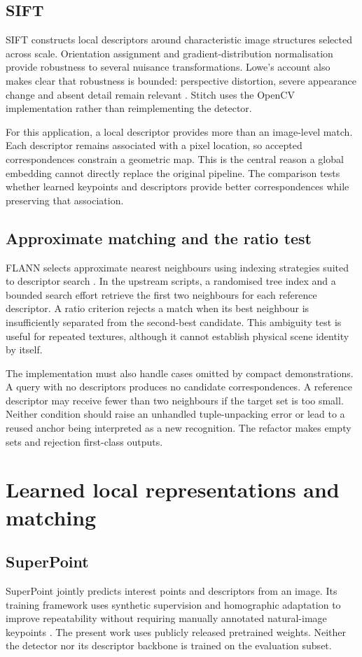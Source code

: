 \subsection{SIFT}
SIFT constructs local descriptors around characteristic image structures selected across scale. Orientation assignment and gradient-distribution normalisation provide robustness to several nuisance transformations. Lowe's account also makes clear that robustness is bounded: perspective distortion, severe appearance change and absent detail remain relevant \citep{lowe2004}. Stitch uses the OpenCV implementation rather than reimplementing the detector.

For this application, a local descriptor provides more than an image-level match. Each descriptor remains associated with a pixel location, so accepted correspondences constrain a geometric map. This is the central reason a global embedding cannot directly replace the original pipeline. The comparison tests whether learned keypoints and descriptors provide better correspondences while preserving that association.

\subsection{Approximate matching and the ratio test}
FLANN selects approximate nearest neighbours using indexing strategies suited to descriptor search \citep{muja2009}. In the upstream scripts, a randomised tree index and a bounded search effort retrieve the first two neighbours for each reference descriptor. A ratio criterion rejects a match when its best neighbour is insufficiently separated from the second-best candidate. This ambiguity test is useful for repeated textures, although it cannot establish physical scene identity by itself.

The implementation must also handle cases omitted by compact demonstrations. A query with no descriptors produces no candidate correspondences. A reference descriptor may receive fewer than two neighbours if the target set is too small. Neither condition should raise an unhandled tuple-unpacking error or lead to a reused anchor being interpreted as a new recognition. The refactor makes empty sets and rejection first-class outputs.

\section{Learned local representations and matching}
\subsection{SuperPoint}
SuperPoint jointly predicts interest points and descriptors from an image. Its training framework uses synthetic supervision and homographic adaptation to improve repeatability without requiring manually annotated natural-image keypoints \citep{detone2018}. The present work uses publicly released pretrained weights. Neither the detector nor its descriptor backbone is trained on the evaluation subset.

